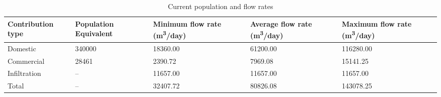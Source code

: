 \begin{table}[h]
  \centering
  \caption{Current population and flow rates}
  \label{tab:current_rates}
  \begin{tabular}{|p{3cm}|p{2.5cm}|p{3cm}|p{3cm}|p{3cm}|}
    \hline
    \textbf{Contribution type} & \textbf{Population Equivalent} & \textbf{Minimum flow rate (m\textsuperscript{3}/day)} & \textbf{Average flow rate (m\textsuperscript{3}/day)} & \textbf{Maximum flow rate (m\textsuperscript{3}/day)} \\
    \hline
    Domestic & 340000 & 18360.00 & 61200.00 & 116280.00 \\
    Commercial & 28461 & 2390.72 & 7969.08 & 15141.25 \\
    Infiltration & -- & 11657.00 & 11657.00 & 11657.00 \\
    Total & -- & 32407.72 & 80826.08 & 143078.25 \\
    \hline
  \end{tabular}
\end{table}
